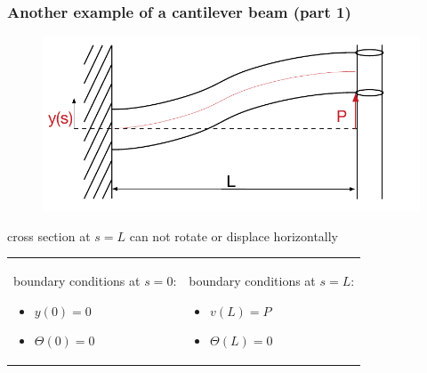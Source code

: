 \begin{frame}
  \frametitle{Another example of a cantilever beam (part 1)}
  
  \vspace{-0.7em}
  \begin{figure}
    \centering
    \includegraphics[width=16cm, keepaspectratio=true]{sections/traditional_beams/images/TimoshenkoCanitleverExample2part1}
  \end{figure}
  \vspace{-0.5em}
  cross section at $s=L$ can not rotate or displace horizontally
  \vspace{1em}
  
  \begin{tabularx}{\linewidth}{XX}
    {
      boundary conditions at $s=0$:
      \begin{itemize}
        \item $y(0) = 0$
        \item $\Theta(0) = 0$
      \end{itemize}
    } & {
      boundary conditions at $s=L$:
      \begin{itemize}
        \item $v(L) = P$
        \item $\Theta(L) = 0$
      \end{itemize}
    }
  \end{tabularx}
\end{frame}


